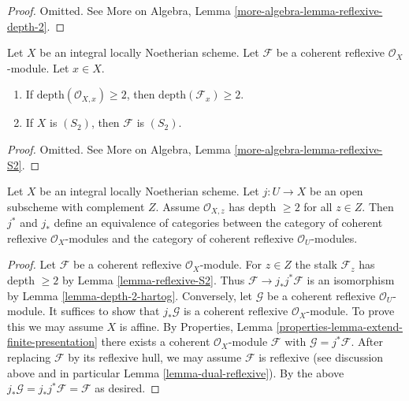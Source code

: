 \begin{proof}
Omitted. See More on Algebra, Lemma \ref{more-algebra-lemma-reflexive-depth-2}.
\end{proof}

\begin{lemma}
\label{lemma-reflexive-S2}
Let $X$ be an integral locally Noetherian scheme.
Let $\mathcal{F}$ be a coherent reflexive $\mathcal{O}_X$-module.
Let $x \in X$.
\begin{enumerate}
\item If $\text{depth}(\mathcal{O}_{X, x}) \geq 2$, then
$\text{depth}(\mathcal{F}_x) \geq 2$.
\item If $X$ is $(S_2)$, then $\mathcal{F}$ is $(S_2)$.
\end{enumerate}
\end{lemma}

\begin{proof}
Omitted. See More on Algebra, Lemma \ref{more-algebra-lemma-reflexive-S2}.
\end{proof}

\begin{lemma}
\label{lemma-reflexive-S2-extend}
Let $X$ be an integral locally Noetherian scheme. Let $j : U \to X$
be an open subscheme with complement $Z$. Assume $\mathcal{O}_{X, z}$
has depth $\geq 2$ for all $z \in Z$. Then $j^*$ and $j_*$ define
an equivalence of categories between the category of coherent reflexive
$\mathcal{O}_X$-modules and the category of coherent reflexive
$\mathcal{O}_U$-modules.
\end{lemma}

\begin{proof}
Let $\mathcal{F}$ be a coherent reflexive $\mathcal{O}_X$-module. For $z \in Z$
the stalk $\mathcal{F}_z$ has depth $\geq 2$ by Lemma \ref{lemma-reflexive-S2}.
Thus $\mathcal{F} \to j_*j^*\mathcal{F}$ is an isomorphism by
Lemma \ref{lemma-depth-2-hartog}. Conversely, let $\mathcal{G}$
be a coherent reflexive $\mathcal{O}_U$-module. It suffices to show that
$j_*\mathcal{G}$ is a coherent reflexive $\mathcal{O}_X$-module.
To prove this we may assume $X$ is affine. By Properties, Lemma
\ref{properties-lemma-extend-finite-presentation}
there exists a coherent $\mathcal{O}_X$-module $\mathcal{F}$
with $\mathcal{G} = j^*\mathcal{F}$. After replacing $\mathcal{F}$
by its reflexive hull, we may assume $\mathcal{F}$ is reflexive
(see discussion above and in particular Lemma \ref{lemma-dual-reflexive}).
By the above $j_*\mathcal{G} = j_*j^*\mathcal{F} = \mathcal{F}$
as desired.
\end{proof}

